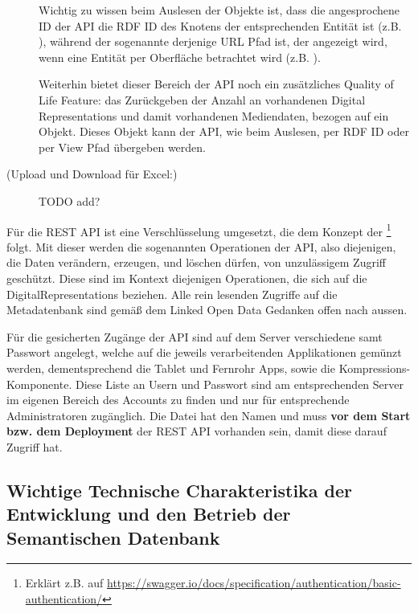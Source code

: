 \begin{description}
	Wichtig zu wissen beim Auslesen der Objekte ist, dass die angesprochene ID der API die RDF ID des Knotens der entsprechenden Entität ist (z.B. \texttt{}), während der sogenannte  derjenige URL Pfad ist, der angezeigt wird, wenn eine Entität per \wisski Oberfläche betrachtet wird (z.B. \texttt{}).
	
	Weiterhin bietet dieser Bereich der API noch ein zusätzliches Quality of Life Feature: das Zurückgeben der Anzahl an vorhandenen Digital Representations und damit vorhandenen Mediendaten, bezogen auf ein Objekt. Dieses Objekt kann der API, wie beim Auslesen, per RDF ID oder per \wisski View Pfad übergeben werden.
	
	\item[(Upload und Download für Excel:)] TODO add?
\end{description}

Für die REST API ist eine Verschlüsselung umgesetzt, die dem Konzept der \footnote{Erklärt z.B. auf \url{https://swagger.io/docs/specification/authentication/basic-authentication/}} folgt. Mit dieser werden die sogenannten  Operationen der API, also diejenigen, die Daten verändern, erzeugen, und löschen dürfen, von unzulässigem Zugriff geschützt. Diese sind im \visit Kontext diejenigen Operationen, die sich auf die DigitalRepresentations beziehen. Alle rein lesenden Zugriffe auf die Metadatenbank sind gemäß dem Linked Open Data Gedanken offen nach aussen.

Für die gesicherten Zugänge der API sind auf dem \visit Server verschiedene  samt Passwort angelegt, welche auf die jeweils verarbeitenden Applikationen gemünzt werden, dementsprechend die Tablet und Fernrohr Apps, sowie die Kompressions-Komponente. Diese Liste an Usern und Passwort sind am entsprechenden Server im eigenen Bereich des  Accounts zu finden und nur für entsprechende Administratoren zugänglich. Die Datei hat den Namen \texttt{} und muss \textbf{vor dem Start bzw. dem Deployment} der REST API vorhanden sein, damit diese darauf Zugriff hat.

\subsection{Wichtige Technische Charakteristika der Entwicklung und den Betrieb der Semantischen Datenbank}\label{sec:features}

